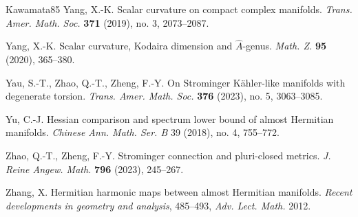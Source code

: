 \documentclass[12pt, reqno]{amsart}
\theoremstyle{plain}
\theoremstyle{definition}
\renewcommand{\hat}{\widehat}
\renewcommand{\>}{\rightarrow}
\renewcommand{\>}{\rightarrow}
\numberwithin{equation}{section} %
\begin{document}
\begin{thebibliography}{Kawamata85}
     Yang, X.-K. Scalar curvature on compact complex manifolds.
    \emph{Trans. Amer. Math. Soc.}  \textbf{371} (2019), no. 3,
    2073--2087.




     Yang, X.-K. Scalar curvature, Kodaira dimension and $\hat
    A$-genus. \emph{Math. Z.} \textbf {95} (2020), 365--380.


     Yau, S.-T., Zhao, Q.-T., Zheng, F.-Y.
    On Strominger K\"{a}hler-like manifolds with degenerate torsion. \emph{Trans. Amer. Math. Soc.}  \textbf{376} (2023), no. 5, 3063--3085.

Yu, C.-J.
Hessian comparison and spectrum lower bound of almost Hermitian manifolds.
\emph{Chinese Ann. Math. Ser. B} 39 (2018), no. 4, 755--772.


     Zhao, Q.-T., Zheng, F.-Y. Strominger connection and pluri-closed metrics.  \emph{J. Reine Angew. Math.} \textbf{796} (2023), 245--267.

    

     Zhang, X. Hermitian harmonic maps between almost Hermitian manifolds.
    \emph{Recent developments in geometry and analysis}, 485--493,
    \emph{Adv. Lect. Math.} 2012.




   \end{thebibliography}





\end{document}

